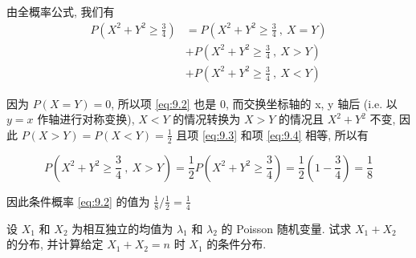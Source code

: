 \documentclass[boxes]{homework}
\begin{document}
\begin{solution}
    由全概率公式, 我们有
    \begin{align}
        \label{eq:9.2}
        P\left(X^2+Y^2\ge \frac{3}{4}\right) &= P\left(X^2+Y^2\ge \frac{3}{4}\ ,\  X=Y\right)\\
        \label{eq:9.3}
        &+P\left(X^2+Y^2\ge \frac{3}{4}\ ,\  X>Y\right)\\
        \label{eq:9.4}
        &+P\left(X^2+Y^2\ge \frac{3}{4}\ ,\  X<Y\right)
    \end{align}
    
    因为 $P(X=Y)=0$, 所以项 \ref{eq:9.2} 也是 0, 而交换坐标轴的 x, y 轴后 (i.e. 以 $y = x$ 作轴进行对称变换), $X<Y$ 的情况转换为 $X>Y$ 的情况且 $X^2+Y^2$ 不变, 因此 $\displaystyle P(X>Y)=P(X<Y)=\frac{1}{2}$ 且项 \ref{eq:9.3} 和项 \ref{eq:9.4} 相等, 所以有

    \begin{equation}
        P\left(X^2+Y^2\ge \frac{3}{4}\ ,\  X>Y\right)=\frac{1}{2}P\left(X^2+Y^2\ge \frac{3}{4}\right) = \frac{1}{2}\left(1-\frac{3}{4}\right) = \frac{1}{8}
    \end{equation}

    因此条件概率 \ref{eq:9.2} 的值为 $\displaystyle\frac{1}{8}/\frac{1}{2}=\frac{1}{4}$
\end{solution}
\begin{problem}
    设 $X_1$ 和 $X_2$ 为相互独立的均值为 $\lambda_1$ 和 $\lambda_2$ 的 Poisson 随机变量. 试求 $X_1+X_2$ 的分布, 并计算给定 $X_1+X_2=n$ 时 $X_1$ 的条件分布.
\end{problem}
\end{document}
